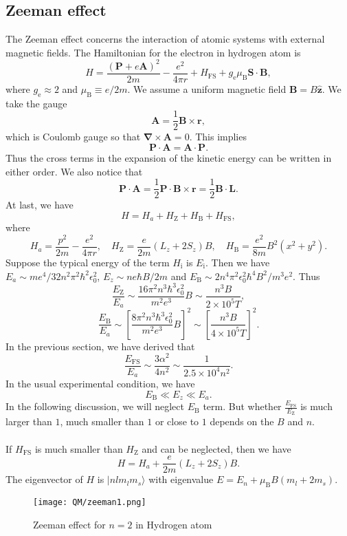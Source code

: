 \subsection{Zeeman effect}
The Zeeman effect concerns the interaction of atomic systems with external magnetic fields. The Hamiltonian for the electron in hydrogen atom is
\[H = \frac{(\bm{P}+e\bm{A})^2}{2m} - \frac{e^2}{4\pi r} + H_{\mathrm{FS}} + g_{\mathrm{e}} \mu_{\mathrm{B}}\bm{S}\cdot\bm{B},\]
where $g_{\mathrm{e}} \approx 2$ and $\mu_{\mathrm{B}} \equiv {e}/{2m}$.
We assume a uniform magnetic field $\bm{B} = B\hat{\bm{z}}$. We take the gauge
\[\bm{A} = \frac{1}{2}\bm{B}\times\bm{r},\]
which is Coulomb gauge so that $\bm{\nabla}\times\bm{A} = 0$. This implies
\[\bm{P}\cdot\bm{A} = \bm{A}\cdot\bm{P}.\]
Thus the cross terms in the expansion of the kinetic energy can be written in either order. 
We also notice that
\[\bm{P}\cdot\bm{A} = \frac{1}{2} \bm{P}\cdot\bm{B}\times\bm{r}  = \frac{1}{2}\bm{B}\cdot\bm{L}.\] 
At last, we have
\[H = H_a + H_{\mathrm{Z}} + H_{\mathrm{B}} + H_{\mathrm{FS}},\]
where
\[H_a = \frac{p^2}{2m} - \frac{e^2}{4\pi r} , \quad  H_{\mathrm{Z}} = \frac{e}{2m}(L_z + 2S_z)B , \quad H_{\mathrm{B}} = \frac{e^2}{8m}B^2(x^2+y^2).\]
Suppose the typical energy of the term $H_{\mathrm{i}}$ is $E_{\mathrm{i}}$. Then we have $E_a \sim {me^4}/{32 n^2 \pi^2\hbar^2\epsilon_0^2}$, $E_z \sim {ne\hbar B}/{2m}$ and $E_{\mathrm{B}} \sim  {2n^4\pi^2 \epsilon_0^2 \hbar^4 B^2}/{m^3 e^2}$. 
Thus
\[\frac{E_{\mathrm{Z}}}{E_a} \sim \frac{16\pi^2 n^3 \hbar^3 \epsilon_0^2}{m^2 e^3} B \sim \frac{n^3B}{2\times10^5 T},\]
\[\frac{E_{\mathrm{B}}}{E_a} \sim \left[ \frac{8\pi^2 n^3 \hbar^3 \epsilon_0^2}{m^2 e^3} B\right]^2 \sim \left[ \frac{n^3B}{4\times10^5 T} \right]^2.\]
In the previous section, we have derived that
\[\frac{E_{\mathrm{FS}}}{E_a} \sim \frac{3\alpha^2}{4n^2} \sim \frac{1}{2.5\times10^4 n^2}.\]
In the usual experimental condition, we have
\[E_{\mathrm{B}} \ll E_z \ll E_a.\]
In the following discussion, we will neglect $E_{\mathrm{B}}$ term.
But whether $\frac{E_{\mathrm{FS}}}{E_{\mathrm{Z}}}$ is much larger than $1$, much smaller than $1$ or close to $1$ depends on the $B$ and $n$.
\\ \\
If $H_{\mathrm{FS}}$ is much smaller than $H_{\mathrm{Z}}$ and can be neglected, then we have
\[H = H_a + \frac{e}{2m}(L_z + 2S_z)B.\]
The eigenvector of $H$ is $|nlm_lm_s\rangle$ with eigenvalue $E = E_n + \mu_{\mathrm{B}} B(m_l+2m_s)$.
\begin{figure}[!h]
	\centering
	\texttt{[image: QM/zeeman1.png]}
	\caption{Zeeman effect for $n=2$ in Hydrogen atom}
\end{figure}
